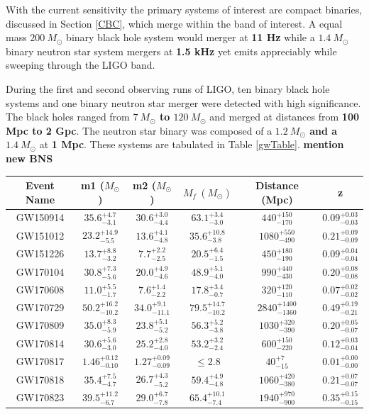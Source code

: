 \documentclass [12pt, proquest]{uwthesis}[2019]
\begin{document}
With the current sensitivity the primary systems of interest are compact binaries, discussed in Section \ref{CBC}, which merge within the band of interest. A equal mass \textbf{$200\ M_\odot$} binary black hole system would merger at \textbf{11 Hz} while a \textbf{$1.4\ M_\odot$} binary neutron star system mergers at \textbf{1.5 kHz} yet emits appreciably while sweeping through the LIGO band.

During the first and second observing runs of LIGO, ten binary black hole systems and one binary neutron star merger were detected with high significance. \cite{GWTC} The black holes ranged from \textbf{$7\ M_\odot$ to $120\ M_\odot$} and merged at distances from \textbf{100 Mpc to 2 Gpc}. The neutron star binary was composed of a \textbf{$1.2\ M_\odot$ and a $1.4\ M_\odot$} at \textbf{1 Mpc}. These systems are tabulated in Table \ref{gwTable}. \textbf{mention new BNS}

\begin{center}
\begin{tabular}{| c | c | c | c | c | c |}
\hline
Event Name & m1 ($M_\odot$) & m2 ($M_\odot$) & $M_f\ (M_\odot)$ & Distance (Mpc) & z\\
\hline \hline
GW150914 & $35.6^{+4.7}_{-3.1}$ & $30.6^{+3.0}_{-4.4}$ & $63.1^{+3.4}_{-3.0}$ & $440^{+150}_{-170}$ & $0.09^{+0.03}_{-0.03}$\\
\hline
GW151012 & $23.2^{+14.9}_{-5.5}$ & $13.6^{+4.1}_{-4.8}$  & $35.6^{+10.8}_{-3.8}$ & $1080^{+550}_{-490}$& $0.21^{+0.09}_{-0.09}$\\
\hline
GW151226 & $13.7^{+8.8}_{-3.2}$ & $7.7^{+2.2}_{-2.5}$ & $20.5^{+6.4}_{-1.5}$ & $450^{+180}_{-190}$ & $0.09^{+0.04}_{-0.04}$\\
\hline
GW170104 & $30.8^{+7.3}_{-5.6}$ & $20.0^{+4.9}_{-4.6}$ & $48.9^{+5.1}_{-4.0}$ & $990^{+440}_{-430}$ & $0.20^{+0.08}_{-0.08}$\\
\hline
GW170608 & $11.0^{+5.5}_{-1.7}$ & $7.6^{+1.4}_{-2.2}$ & $17.8^{+3.4}_{-0.7}$ & $320^{+120}_{-110}$ & $0.07^{+0.02}_{-0.02}$\\
\hline
GW170729 & $50.2^{+16.2}_{-10.2}$ & $34.0^{+9.1}_{-11.1}$ & $79.5^{+14.7}_{-10.2}$ & $2840^{+1400}_{-1360}$ & $0.49^{+0.19}_{-0.21}$\\
\hline
GW170809 & $35.0^{+8.3}_{-5.9}$ & $23.8^{+5.1}_{-5.2}$ & $56.3^{+5.2}_{-3.8}$ & $1030^{+320}_{-390}$ & $0.20^{+0.05}_{-0.07}$\\
\hline
GW170814 & $30.6^{+5.6}_{-3.0}$ & $25.2^{+2.8}_{-4.0}$ & $53.2^{+3.2}_{-2.4}$ & $600^{+150}_{-220}$ & $0.12^{+0.03}_{-0.04}$\\
\hline
GW170817 & $1.46^{+0.12}_{-0.10}$ & $1.27^{+0.09}_{-0.09}$ & $\le2.8$ & $40^{+7}_{-15}$ & $0.01^{+0.00}_{-0.00}$\\
\hline
GW170818 & $35.4^{+7.5}_{-4.7}$ & $26.7^{+4.3}_{-5.2}$ & $59.4^{+4.9}_{-4.8}$ & $1060^{+420}_{-380}$ & $0.21^{+0.07}_{-0.07}$\\
\hline
GW170823 & $39.5^{+11.2}_{-6.7}$ & $29.0^{+6.7}_{-7.8}$ & $65.4^{+10.1}_{-7.4}$ & $1940^{+970}_{-900}$ & $0.35^{+0.15}_{-0.15}$\\
\hline
\end{tabular}
\label{gwTable}
\end{center}
\end{document}

